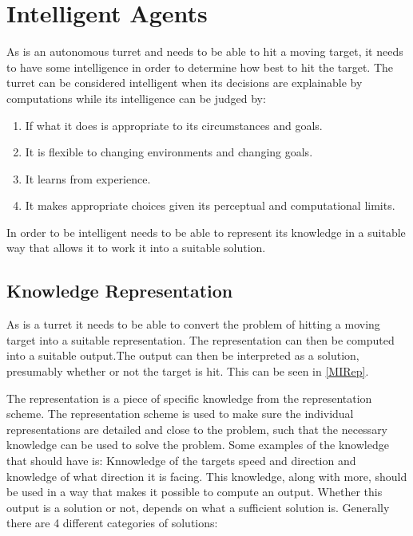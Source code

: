 \section{Intelligent Agents}
 
As \name is an autonomous turret and needs to be able to hit a moving target,
it needs to have some intelligence in order to determine how best to hit the
target. The turret can be considered intelligent \citep[ch.1.1]{MIBook} when its
decisions are explainable by computations while its intelligence can be judged
by:

\begin{enumerate}
  \item If what it does is appropriate to its circumstances and goals.
  \item It is flexible to changing environments and changing goals.
  \item It learns from experience.
  \item It makes appropriate choices given its perceptual and computational
  limits.
\end{enumerate}

In order to be intelligent \name needs to be able to represent its knowledge in
a suitable way that allows it to work it into a suitable solution. 

\subsection{Knowledge Representation}\label{KR}

As \name is a turret it needs to be able to convert the problem of hitting a
moving target into a suitable representation. The representation can then be
computed into a suitable output.The output can then be interpreted as
a solution, presumably whether or not the target is hit. This can be seen in
\autoref{MIRep}.


The representation is a piece of specific knowledge from the representation
scheme. The representation scheme is used to make sure the individual
representations are detailed and close to the problem, such that the necessary
knowledge can be used to solve the problem\citep{MIBook}. Some examples of the
knowledge that \name should have is: Knnowledge of the targets speed and
direction and knowledge of what direction it is facing. This knowledge, along
with more, should be used in a way that makes it possible to compute an output.
Whether this output is a solution or not, depends on what a sufficient solution
is. Generally there are 4 different categories of solutions:

